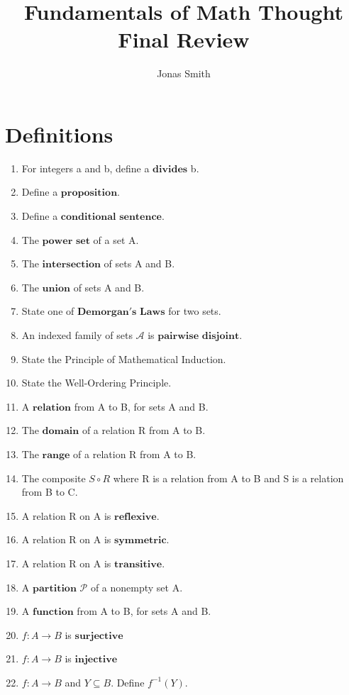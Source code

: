 \documentclass[11pt]{article}
\begin{document}
\author{Jonas Smith}
\title{Fundamentals of Math Thought Final Review}
\maketitle

\medskip

\section*{Definitions}
\begin{enumerate}
    \item For integers a and b, define a $\mathbf{divides}$ b.
    \item Define a $\mathbf{proposition}$.
    \item Define a $\mathbf{conditional}$ $\mathbf{sentence}$.
    \item The $\mathbf{power}$ $\mathbf{set}$ of a set A.
    \item The $\mathbf{intersection}$ of sets A and B.
    \item The $\mathbf{union}$ of sets A and B.
    \item State one of $\mathbf{Demorgan's}$ $\mathbf{Laws}$ for two sets.
    \item An indexed family of sets $\mathscr{A}$ is $\mathbf{pairwise}$ $\mathbf{disjoint}$.
    \item State the Principle of Mathematical Induction.
    \item State the Well-Ordering Principle.
    \item A $\mathbf{relation}$ from A to B, for sets A and B.
    \item The $\mathbf{domain}$ of a relation R from A to B.
    \item The $\mathbf{range}$ of a relation R from A to B.
    \item The composite $S \circ R$ where R is a relation from A to B and S is a relation from B to C. 
    \item A relation R on A is $\mathbf{reflexive}$.
    \item A relation R on A is $\mathbf{symmetric}$.
    \item A relation R on A is $\mathbf{transitive}$.
    \item A $\mathbf{partition}$ $\mathscr{P}$ of a nonempty set A.
    \item A $\mathbf{function}$ from A to B, for sets A and B.
    \item $f:A\rightarrow B$ is $\mathbf{surjective}$
    \item $f:A\rightarrow B$ is $\mathbf{injective}$
    \item $f:A\rightarrow B$ and $Y \subseteq B$. Define $f^{-1}(Y).$
\end{enumerate}
\pagebreak
\end{document}
